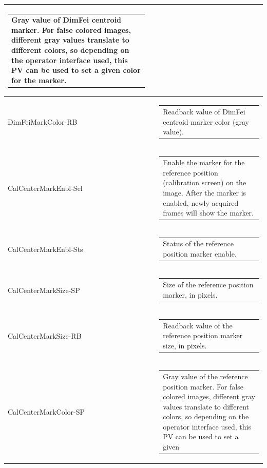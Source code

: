 \documentclass[openany]{article}
\begin{document}
\begin{longtable}{| m{3.0cm} m{4.5cm} m{7.0cm} |}
\begin{tabular}{@{}m{6cm}@{}}
                Gray value of DimFei centroid marker. For false colored images,
                different gray values translate to different colors, so depending
                on the operator interface used, this PV can be used to set a given
                color for the marker.
            \end{tabular} \hypertarget{}{}\\ \hline
        DimFeiMarkColor-RB &  & \begin{tabular}{@{}m{6cm}@{}}
                Readback value of DimFei centroid marker color (gray value).
            \end{tabular} \hypertarget{pv:cal-center-mark-enbl}{}\\ \hline
        CalCenterMarkEnbl-Sel &  & \begin{tabular}{@{}m{6cm}@{}}
                Enable the marker for the reference position (calibration screen)
                on the image. After the marker is enabled, newly acquired frames will
                show the marker.
            \end{tabular} \hypertarget{}{}\\ \hline
        CalCenterMarkEnbl-Sts &  & \begin{tabular}{@{}m{6cm}@{}}
                Status of the reference position marker enable.
            \end{tabular} \hypertarget{pv:cal-center-mark-size}{}\\ \hline
        CalCenterMarkSize-SP &  & \begin{tabular}{@{}m{6cm}@{}}
                Size of the reference position marker, in pixels.
            \end{tabular} \hypertarget{}{}\\ \hline
        CalCenterMarkSize-RB &  & \begin{tabular}{@{}m{6cm}@{}}
                Readback value of the reference position marker size, in pixels.
            \end{tabular} \hypertarget{pv:cal-center-mark-color}{}\\ \hline
        CalCenterMarkColor-SP &  & \begin{tabular}{@{}m{6cm}@{}}
                Gray value of the reference position marker. For false colored images,
                different gray values translate to different colors, so depending
                on the operator interface used, this PV can be used to set a given

\end{tabular}
\end{longtable}
\end{document}
